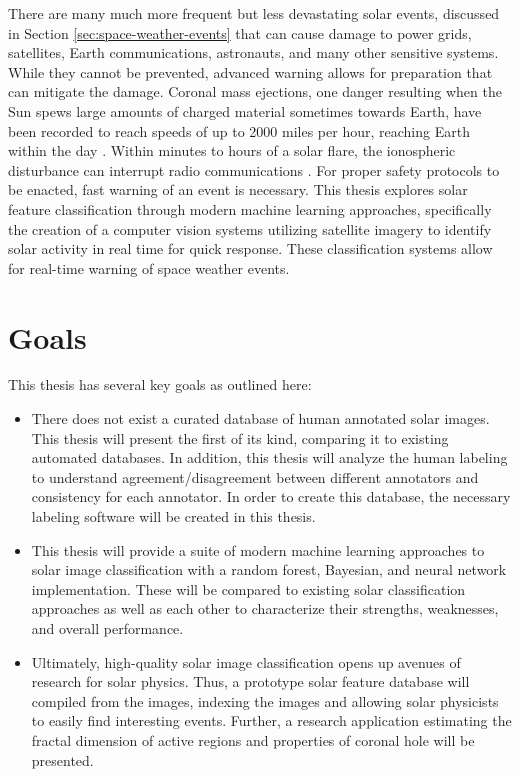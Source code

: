 \documentclass[twoside]{report}
\begin{document}
There are many much more frequent but less devastating solar events, discussed in Section \ref{sec:space-weather-events} that can cause damage to power grids, satellites, Earth communications, astronauts, and many other sensitive systems. While they cannot be prevented, advanced warning allows for preparation that can mitigate the damage. Coronal mass ejections, one danger resulting when the Sun spews large amounts of charged material sometimes towards Earth, have been recorded to reach speeds of up to 2000 miles per hour, reaching Earth within the day \cite{fastcme}. Within minutes to hours of a solar flare, the ionospheric disturbance can interrupt radio communications \cite{swap}. For proper safety protocols to be enacted, fast warning of an event is necessary.  This thesis explores solar feature classification through modern machine learning approaches, specifically the creation of a computer vision systems utilizing satellite imagery to identify solar activity in real time for quick response. These classification systems allow for real-time warning of space weather events.

\section{Goals}

This thesis has several key goals as outlined here:
\begin{itemize}
\item There does not exist a curated database of human annotated solar images. This thesis will present the first of its kind, comparing it to existing automated databases. In addition, this thesis will analyze the human labeling to understand agreement/disagreement between different annotators and consistency for each annotator. In order to create this database, the necessary labeling software will be created in this thesis.
\item This thesis will provide a suite of modern machine learning approaches to solar image classification with a random forest, Bayesian, and neural network implementation. These will be compared to existing solar classification approaches as well as each other to characterize their strengths, weaknesses, and overall performance.
\item Ultimately, high-quality solar image classification opens up avenues of research for solar physics. Thus, a prototype solar feature database will compiled from the images, indexing the images and allowing solar physicists to easily find interesting events. Further, a research application estimating the fractal dimension of active regions and properties of coronal hole will be presented.
\end{itemize}
\end{document}
